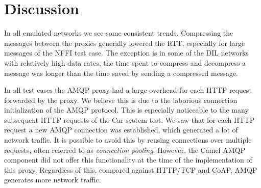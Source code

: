 \begin{landscape}
    \begin{figure}
    \centering
    \begin{floatrow}
    \end{floatrow}
    \end{figure}
\end{landscape}

\section{Discussion}
\label{section:evaluation-discussion}

In all emulated networks we see some consistent trends. Compressing the messages
between the proxies generally lowered the RTT, especially for large messages of
the NFFI test case. The exception is in some of the DIL networks with relatively
high data rates, the time spent to compress and decompress a message was longer
than the time saved by sending a compressed message.

In all test cases the AMQP proxy had a large overhead for each HTTP request
forwarded by the proxy. We believe this is due to the laborious connection
initialization of the AMQP protocol. This is especially noticeable to the many
subsequent HTTP requests of the Car system test. We saw that for each HTTP
request a new AMQP connection was established, which generated a lot of network
traffic. It is possible to avoid this by reusing connections over multiple
requests, often referred to as \textit{connection pooling}. However, the Camel
AMQP component did not offer this functionality at the time of the
implementation of this proxy. Regardless of this, compared against HTTP/TCP and
CoAP, AMQP generates more network traffic.

